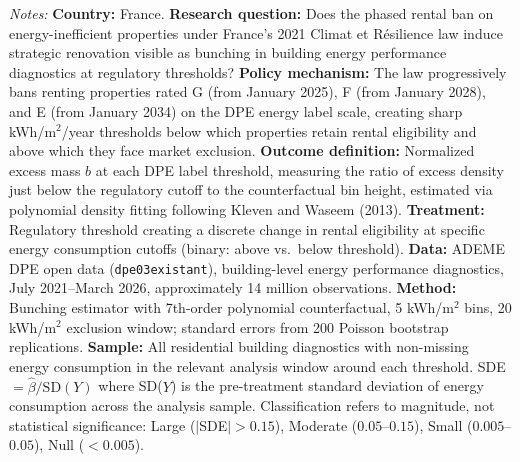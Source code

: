 \begin{table}[htbp]
\begin{tablenotes}
\item \textit{Notes:} \textbf{Country:} France. \textbf{Research question:} Does the phased rental ban on energy-inefficient properties under France's 2021 Climat et R\'{e}silience law induce strategic renovation visible as bunching in building energy performance diagnostics at regulatory thresholds? \textbf{Policy mechanism:} The law progressively bans renting properties rated G (from January 2025), F (from January 2028), and E (from January 2034) on the DPE energy label scale, creating sharp kWh/m$^2$/year thresholds below which properties retain rental eligibility and above which they face market exclusion. \textbf{Outcome definition:} Normalized excess mass $b$ at each DPE label threshold, measuring the ratio of excess density just below the regulatory cutoff to the counterfactual bin height, estimated via polynomial density fitting following Kleven and Waseem (2013). \textbf{Treatment:} Regulatory threshold creating a discrete change in rental eligibility at specific energy consumption cutoffs (binary: above vs.\ below threshold). \textbf{Data:} ADEME DPE open data (\texttt{dpe03existant}), building-level energy performance diagnostics, July 2021--March 2026, approximately 14 million observations. \textbf{Method:} Bunching estimator with 7th-order polynomial counterfactual, 5 kWh/m$^2$ bins, 20 kWh/m$^2$ exclusion window; standard errors from 200 Poisson bootstrap replications. \textbf{Sample:} All residential building diagnostics with non-missing energy consumption in the relevant analysis window around each threshold. SDE $= \hat{\beta} / \text{SD}(Y)$ where SD($Y$) is the pre-treatment standard deviation of energy consumption across the analysis sample. Classification refers to magnitude, not statistical significance: Large ($|$SDE$| > 0.15$), Moderate ($0.05$--$0.15$), Small ($0.005$--$0.05$), Null ($< 0.005$).
\end{tablenotes}
\end{table}
